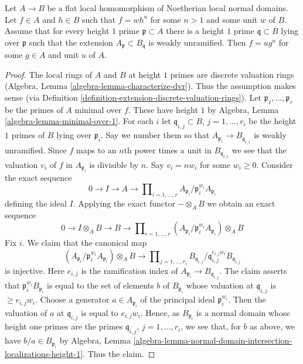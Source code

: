 \begin{lemma}
\label{lemma-extension-normal-domains-and-roots}
Let $A \to B$ be a flat local homomorphism of Noetherian local normal domains.
Let $f \in A$ and $h \in B$ such that $f = w h^n$ for some $n > 1$ and some
unit $w$ of $B$. Assume that for every height $1$ prime
$\mathfrak p \subset A$ there is a height $1$ prime
$\mathfrak q \subset B$ lying over $\mathfrak p$
such that the extension $A_\mathfrak p \subset B_\mathfrak q$ is
weakly unramified. Then $f = u g^n$ for some $g \in A$ and unit $u$ of $A$.
\end{lemma}

\begin{proof}
The local rings of $A$ and $B$ at height $1$ primes are
discrete valuation rings (Algebra, Lemma \ref{algebra-lemma-characterize-dvr}).
Thus the assumption makes sense (via
Definition \ref{definition-extension-discrete-valuation-rings}).
Let $\mathfrak p_1, \ldots, \mathfrak p_r$ be the primes of $A$ minimal
over $f$. These have height $1$ by
Algebra, Lemma \ref{algebra-lemma-minimal-over-1}.
For each $i$ let $\mathfrak q_{i, j} \subset B$, $j = 1, \ldots, r_i$
be the height $1$ primes of $B$ lying over $\mathfrak p_i$.
Say we number them so that  $A_{\mathfrak p_i} \to B_{\mathfrak q_{i, 1}}$
is weakly unramified.
Since $f$ maps to an $n$th power times a unit in $B_{\mathfrak q_{i, 1}}$
we see that the valuation $v_i$ of $f$ in $A_{\mathfrak p_i}$ is
divisible by $n$. Say $v_i = n w_i$ for some $w_i \geq 0$.
Consider the exact sequence
$$
0 \to I \to A \to
\prod\nolimits_{i = 1, \ldots, r}
A_{\mathfrak p_i}/\mathfrak p_i^{w_i}A_{\mathfrak p_i}
$$
defining the ideal $I$. Applying the exact functor $- \otimes_A B$ we obtain
an exact sequence
$$
0 \to I \otimes_A B \to B \to
\prod\nolimits_{i = 1, \ldots, r}
(A_{\mathfrak p_i}/\mathfrak p_i^{w_i}A_{\mathfrak p_i}) \otimes_A B
$$
Fix $i$. We claim that the canonical map
$$
(A_{\mathfrak p_i}/\mathfrak p_i^{w_i}A_{\mathfrak p_i}) \otimes_A B
\to
\prod\nolimits_{j = 1, \ldots, r_i}
B_{\mathfrak q_{i, j}}/\mathfrak q_{i, j}^{e_{i, j}w_i}B_{\mathfrak q_{i, j}}
$$
is injective. Here $e_{i, j}$ is the ramification index of 
$A_{\mathfrak p_i} \to B_{\mathfrak q_{i, j}}$.
The claim asserts that $\mathfrak p_i^{w_i}B_{\mathfrak p_i}$
is equal to the set of elements $b$ of $B_{\mathfrak p_i}$
whose valuation at $\mathfrak q_{i, j}$ is $\geq e_{i, j}w_i$.
Choose a generator $a \in A_{\mathfrak p_i}$ of the principal
ideal $\mathfrak p_i^{w_i}$. Then the valuation of $a$ at
$\mathfrak q_{i, j}$ is equal to $e_{i, j}w_i$. Hence,
as $B_{\mathfrak p_i}$ is a normal domain whose height one
primes are the primes $\mathfrak q_{i, j}$, $j = 1, \ldots, r_i$,
we see that, for $b$ as above, we have $b/a \in B_{\mathfrak p_i}$ by
Algebra, Lemma
\ref{algebra-lemma-normal-domain-intersection-localizations-height-1}.
Thus the claim.


\end{proof}
